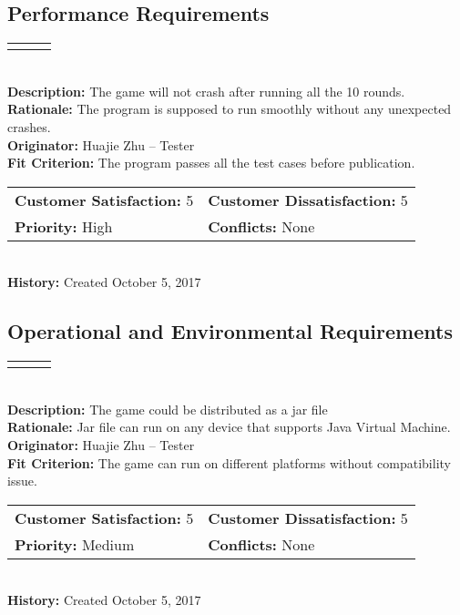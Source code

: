 \documentclass[12pt]{article}
\begin{document}
\subsection{Performance Requirements}


\begin{reqbox}
\begin{tabular}{ccc}\color{red}{Requirement: UFR04}
\end{tabular} \\
\textbf{Description:} The game will not crash after running all the 10 rounds.\\
\textbf{Rationale:} The program is supposed to run smoothly without any unexpected crashes.\\
\textbf{Originator:} Huajie Zhu -- Tester \\
\textbf{Fit Criterion:} The program passes all the test cases before publication.\\
\begin{tabular}{ll}
\textbf{Customer Satisfaction:} 5 & \textbf{Customer Dissatisfaction:} 5 \\
\textbf{Priority:} High & \textbf{Conflicts:} None\\
\end{tabular} \\
\textbf{History:} Created October 5, 2017
\end{reqbox}



\subsection{Operational and Environmental Requirements}

\begin{reqbox}
\begin{tabular}{ccc}\color{red}{Requirement: UFR05}
\end{tabular} \\
\textbf{Description:} The game could be distributed as a jar file\\
\textbf{Rationale:} Jar file can run on any device that supports Java Virtual Machine.\\
\textbf{Originator:} Huajie Zhu -- Tester \\
\textbf{Fit Criterion:} The game can run on different platforms without compatibility issue.\\
\begin{tabular}{ll}
\textbf{Customer Satisfaction:} 5 & \textbf{Customer Dissatisfaction:} 5 \\
\textbf{Priority:} Medium & \textbf{Conflicts:} None\\
\end{tabular} \\
\textbf{History:} Created October 5, 2017
\end{reqbox}
\end{document}
